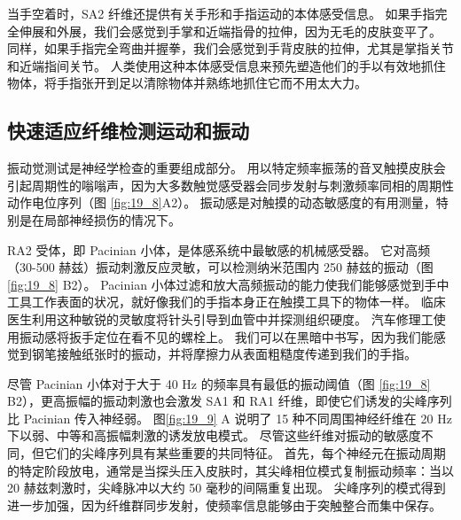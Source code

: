当手空着时，SA2 纤维还提供有关手形和手指运动的本体感受信息。 
如果手指完全伸展和外展，我们会感觉到手掌和近端指骨的拉伸，因为无毛的皮肤变平了。 
同样，如果手指完全弯曲并握拳，我们会感觉到手背皮肤的拉伸，尤其是掌指关节和近端指间关节。 
人类使用这种本体感受信息来预先塑造他们的手以有效地抓住物体，将手指张开到足以清除物体并熟练地抓住它而不用太大力。


\subsection{快速适应纤维检测运动和振动}
振动觉测试是神经学检查的重要组成部分。 
用以特定频率振荡的音叉触摸皮肤会引起周期性的嗡嗡声，因为大多数触觉感受器会同步发射与刺激频率同相的周期性动作电位序列（图 \ref{fig:19_8}A2）。 
振动感是对触摸的动态敏感度的有用测量，特别是在局部神经损伤的情况下。


RA2 受体，即 Pacinian 小体，是体感系统中最敏感的机械感受器。 
它对高频（30-500 赫兹）振动刺激反应灵敏，可以检测纳米范围内 250 赫兹的振动（图 \ref{fig:19_8} B2）。 
Pacinian 小体过滤和放大高频振动的能力使我们能够感觉到手中工具工作表面的状况，就好像我们的手指本身正在触摸工具下的物体一样。 
临床医生利用这种敏锐的灵敏度将针头引导到血管中并探测组织硬度。 
汽车修理工使用振动感将扳手定位在看不见的螺栓上。 
我们可以在黑暗中书写，因为我们能感觉到钢笔接触纸张时的振动，并将摩擦力从表面粗糙度传递到我们的手指。


尽管 Pacinian 小体对于大于 40 Hz 的频率具有最低的振动阈值（图 \ref{fig:19_8} B2），更高振幅的振动刺激也会激发 SA1 和 RA1 纤维，即使它们诱发的尖峰序列比 Pacinian 传入神经弱。 
图\ref{fig:19_9} A 说明了 15 种不同周围神经纤维在 20 Hz 下以弱、中等和高振幅刺激的诱发放电模式。 
尽管这些纤维对振动的敏感度不同，但它们的尖峰序列具有某些重要的共同特征。 
首先，每个神经元在振动周期的特定阶段放电，通常是当探头压入皮肤时，其尖峰相位模式复制振动频率：当以 20 赫兹刺激时，尖峰脉冲以大约 50 毫秒的间隔重复出现。 
尖峰序列的模式得到进一步加强，因为纤维群同步发射，使频率信息能够由于突触整合而集中保存。

